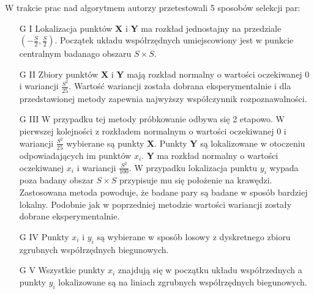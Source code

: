 W trakcie prac nad algorytmem autorzy przetestowali 5 sposobów selekcji par:
\begin{enumerate}
\item[G I] Lokalizacja punktów \textbf{X} i \textbf{Y} ma rozkład jednostajny na przedziale $(-\frac{S}{2},\frac{S}{2})$. Początek układu współrzędnych umiejscowiony jest w punkcie centralnym badanago obszaru $S\times S$. 
\item[G II] Zbiory punktów \textbf{X} i \textbf{Y} mają rozkład normalny o wartości oczekiwanej 0 i wariancji $\frac{S^2}{25}$. Wartość wariancji została dobrana eksperymentalnie i dla przedstawionej metody zapewnia najwyższy współczynnik rozpoznawalności.
\item[G III] W przypadku tej metody próbkowanie odbywa się 2 etapowo. W pierwszej kolejności z rozkładem normalnym o wartości oczekiwanej 0 i wariancji $\frac{S^2}{25}$ wybierane są punkty \textbf{X}. Punkty \textbf{Y} są lokalizowane w otoczeniu odpowiadających im punktów $x_i$.  \textbf{Y} ma rozkład normalny o wartości oczekiwanej $x_i$ i wariancji $\frac{S^2}{100}$. W przypadku lokalizacja punktu $y_i$ wypada poza badany obszar $S\times S$ przypisuje mu się położenie na krawędzi. Zastosowana metoda powoduje, że badane pary są badane w sposób bardziej lokalny. Podobnie jak w poprzedniej metodzie wartości wariancji zostały dobrane eksperymentalnie.
\item[G IV] Punkty $x_i$ i $y_i$ są wybierane w sposób losowy z dyskretnego zbioru zgrubnych współrzędnych biegunowych.
\item[G V] Wszystkie punkty $x_i$ znajdują się w początku układu współrzednych a punkty $y_i$ lokalizowane są na liniach zgrubnych współrzędnych biegunowych.
\end{enumerate}

